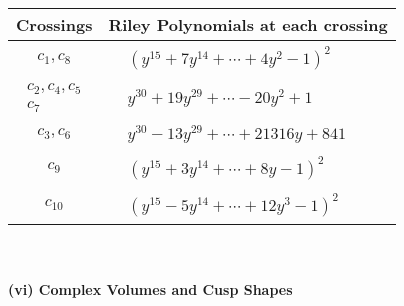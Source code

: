 \documentclass[1p]{elsarticle_modified}
\theoremstyle{definition}
\begin{document}
\begin{tabular}{m{50pt}|m{274pt}}
Crossings & \hspace{64pt}Riley Polynomials at each crossing \\
\hline $$\begin{aligned}c_{1},c_{8}\end{aligned}$$&$\begin{aligned}
&(y^{15}+7 y^{14}+\cdots+4 y^2-1)^{2}
\end{aligned}$\\
\hline $$\begin{aligned}c_{2},c_{4},c_{5}\\c_{7}\end{aligned}$$&$\begin{aligned}
&y^{30}+19 y^{29}+\cdots-20 y^2+1
\end{aligned}$\\
\hline $$\begin{aligned}c_{3},c_{6}\end{aligned}$$&$\begin{aligned}
&y^{30}-13 y^{29}+\cdots+21316 y+841
\end{aligned}$\\
\hline $$\begin{aligned}c_{9}\end{aligned}$$&$\begin{aligned}
&(y^{15}+3 y^{14}+\cdots+8 y-1)^{2}
\end{aligned}$\\
\hline $$\begin{aligned}c_{10}\end{aligned}$$&$\begin{aligned}
&(y^{15}-5 y^{14}+\cdots+12 y^3-1)^{2}
\end{aligned}$\\
\hline
\end{tabular}\\~\\
\newpage\flushleft \textbf{(vi) Complex Volumes and Cusp Shapes}
\end{document}
